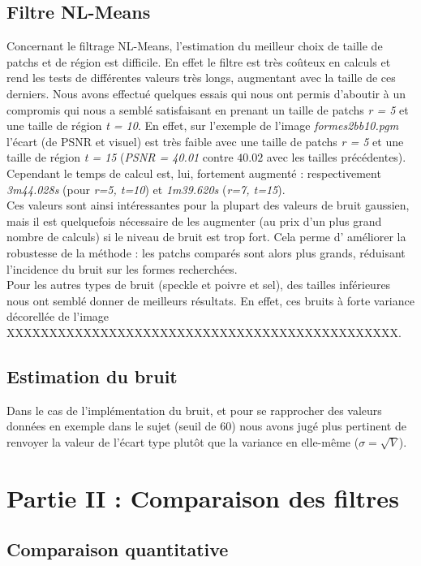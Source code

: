 \documentclass[a4,12pt]{article}
\begin{document}
\subsection{Filtre NL-Means}
Concernant le filtrage NL-Means, l'estimation du meilleur choix de taille de patchs et de région est difficile. En effet le filtre est très coûteux en calculs et rend les tests de différentes valeurs très longs, augmentant avec la taille de ces derniers. Nous avons effectué quelques essais qui nous ont permis d'aboutir à un compromis qui nous a semblé satisfaisant en prenant un taille de patchs \textit{r = 5} et une taille de région \textit{t = 10}. En effet, sur l'exemple de l'image \textit{formes2bb10.pgm} l'écart (de PSNR et visuel) est très faible avec une taille de patchs \textit{r = 5} et une taille de région \textit{t = 15} (\textit{PSNR = 40.01} contre $40.02$ avec les tailles précédentes). Cependant le temps de calcul est, lui, fortement augmenté : respectivement \textit{3m44.028s} (pour \textit{r=5, t=10}) et \textit{1m39.620s} (\textit{r=7, t=15}).\\

Ces valeurs sont ainsi intéressantes pour la plupart des valeurs de bruit gaussien, mais il est quelquefois nécessaire de les augmenter (au prix d'un plus grand nombre de calculs) si le niveau de bruit est trop fort. Cela perme d' améliorer la robustesse de la méthode : les patchs comparés sont alors plus grands, réduisant l'incidence du bruit sur les formes recherchées.\\

Pour les autres types de bruit (speckle et poivre et sel), des tailles inférieures nous ont semblé donner de meilleurs résultats. En effet, ces bruits à forte variance décorellée de l'image XXXXXXXXXXXXXXXXXXXXXXXXXXXXXXXXXXXXXXXXXXXXXX.

\subsection{Estimation du bruit}
Dans le cas de l'implémentation du bruit, et pour se rapprocher des valeurs données en exemple dans le sujet (seuil de 60) nous avons jugé plus pertinent de renvoyer la valeur de l'écart type plutôt que la variance en elle-même ($\sigma = \sqrt{V}$).


\section{Partie II : Comparaison des filtres}
\subsection{Comparaison quantitative}
\end{document}
